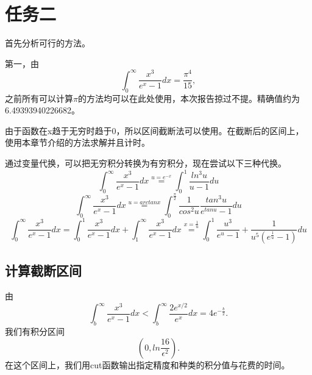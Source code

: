 \documentclass[a4paper,11pt,onecolumn,twoside]{article}
\begin{document}
\section{任务二}
首先分析可行的方法。\par
第一，由$$\int_0^{\infty}\frac{x^3}{e^x-1}dx=\frac{\pi ^4}{15},$$之前所有可以计算$\pi$的方法均可以在此处使用，本次报告掠过不提。精确值约为6.49393940226682。\par
由于函数在x趋于无穷时趋于0，所以区间截断法可以使用。在截断后的区间上，使用本章节介绍的方法求解并且计时。\par
通过变量代换，可以把无穷积分转换为有穷积分，现在尝试以下三种代换。
$$\int_0^{\infty}\frac{x^3}{e^x-1}dx\overset{u=e^{-x}}{=}\int^1_{0}\frac{ln^3u}{u-1}du$$
$$\int_0^{\infty}\frac{x^3}{e^x-1}dx\overset{u=arctanx}{=}\int^{\frac{\pi}{2}}_{0}\frac{1}{cos^2u}\frac{tan^3u}{e^{tanu}-1}du$$
$$\int_0^{\infty}\frac{x^3}{e^x-1}dx=\int_0^{1}\frac{x^3}{e^x-1}dx+\int_1^{\infty}\frac{x^3}{e^x-1}dx\overset{x=\frac{1}{u}}{=}\int^1_{0}\frac{u^3}{e^u-1}+\frac{1}{u^5(e^{\frac{1}{u}}-1)}du$$
\subsection{计算截断区间}
由$$\int_b^{\infty}\frac{x^3}{e^x-1}dx<\int_b^{\infty}\frac{2e^{x/2}}{e^x}dx=4e^{-\frac{b}{2}}.$$
我们有积分区间$$(0,  ln \frac{16}{\epsilon^2}).$$
在这个区间上，我们用cut函数输出指定精度和种类的积分值与花费的时间。
\end{document}
